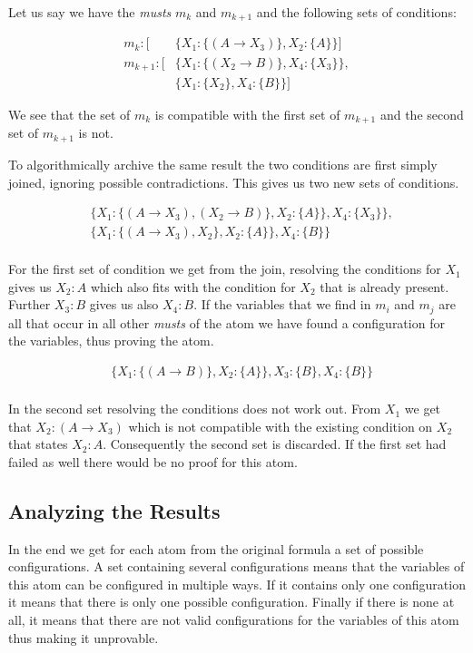 Let us say we have the \emph{musts} $m_k$ and $m_{k+1}$ and the following sets of conditions: 

\begin{align*}
	m_k: [	& \{X_1: \{(A \rightarrow X_3)\}, X_2: \{A\}\}]\\
	m_{k+1}: [	& \{X_1: \{(X_2 \rightarrow B)\}, X_4: \{X_3\}\},\\
			& \{X_1: \{X_2\}, X_4: \{B\}\}]
\end{align*}

We see that the set of $m_k$ is compatible with the first set of $m_{k+1}$ and the second set of $m_{k+1}$ is not.

To algorithmically archive the same result the two conditions are first simply joined, ignoring possible contradictions. This gives us two new sets of conditions.

\begin{align*}
	& \{	X_1: \{(A \rightarrow X_3), (X_2 \rightarrow B)\}, 
						X_2: \{A\}\}, 
						X_4: \{X_3\}\},\\
					& \{X_1: \{(A \rightarrow X_3), X_2\},
						X_2: \{A\}\}, 
						X_4: \{B\}\}\\
\end{align*}


For the first set of condition we get from the join, resolving the conditions for $X_1$ gives us $X_2:A$ which also fits with the condition for $X_2$ that is already present. Further $X_3: B$ gives us also $X_4: B$. If the variables that we find in $m_i$ and $m_j$ are all that occur in all other \emph{musts} of the atom we have found a configuration for the variables, thus proving the atom.

\begin{align*}
	& \{X_1: \{(A \rightarrow B)\}, X_2: \{A\}\}, X_3: \{B\}, X_4: \{B\}\}\\
\end{align*}

In the second set resolving the conditions does not work out. From $X_1$ we get that $X_2: (A \rightarrow X_3)$ which is not compatible with the existing condition on $X_2$ that states $X_2: A$. Consequently the second set is discarded. If the first set had failed as well there would be no proof for this atom.


\subsection{Analyzing the Results}
In the end we get for each atom from the original formula a set of possible configurations. A set containing several configurations means that the variables of this atom can be configured in multiple ways. If it contains only one configuration it means that there is only one possible configuration. Finally if there is none at all, it means that there are not valid configurations for the variables of this atom thus making it unprovable. 

